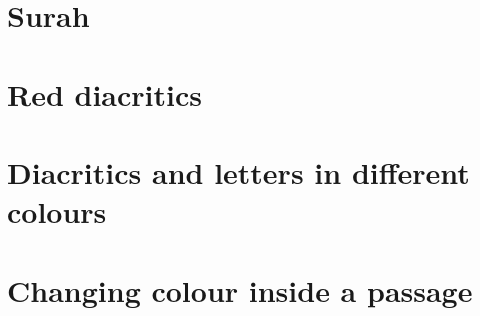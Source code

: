 \documentclass{article}
\begin{document}
\section*{Surah \surahname[97]}
\begin{txarab}
  \quransurah[97]
\end{txarab}

\section*{Red diacritics}
\begin{txarab}
  \quransurah[97]
\end{txarab}

\section*{Diacritics and letters in different colours}
\begin{txarab}
  \textcolor{blue!60!black}{\quranayah[1][1-4]}
\end{txarab}

\section*{Changing colour inside a passage}
\begin{txarab}
  {\quranayah[112][1-2]}
  \quranayah[112][3]
  {\DiacriticColorOff\quranayah[112][4]}
\end{txarab}
\end{document}
